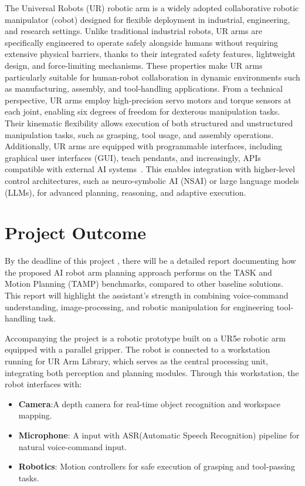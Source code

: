 \documentclass[12pt]{extarticle}
\begin{document}
The Universal Robots (UR) robotic arm is a widely adopted collaborative robotic manipulator (cobot) designed for flexible deployment in industrial, engineering, and research settings. Unlike traditional industrial robots, UR arms are specifically engineered to operate safely alongside humans without requiring extensive physical barriers, thanks to their integrated safety features, lightweight design, and force-limiting mechanisms. These properties make UR arms particularly suitable for human-robot collaboration in dynamic environments such as manufacturing, assembly, and tool-handling applications.
From a technical perspective, UR arms employ high-precision servo motors and torque sensors at each joint, enabling six degrees of freedom for dexterous manipulation tasks. Their kinematic flexibility allows execution of both structured and unstructured manipulation tasks, such as grasping, tool usage, and assembly operations. Additionally, UR arms are equipped with programmable interfaces, including graphical user interfaces (GUI), teach pendants, and increasingly, APIs compatible with external AI systems~\cite{urarm}. This enables integration with higher-level control architectures, such as neuro-symbolic AI (NSAI) or large language models (LLMs), for advanced planning, reasoning, and adaptive execution.


\newpage
\section{Project Outcome}

By the deadline of this project , there will be a detailed report documenting how the proposed AI robot arm planning approach performs on the TASK and Motion Planning (TAMP) benchmarks, compared to other baseline solutions. This report will highlight the assistant's strength in combining voice-command understanding, image-processing, and robotic manipulation for engineering tool-handling task.

Accompanying the project is a robotic prototype built on a UR5e robotic arm equipped with a parallel gripper. The robot is connected to a workstation running for UR Arm Library, which serves as the central processing unit, integrating both perception and planning modules. Through this workstation, the robot interfaces with:

\begin{itemize}
    \item \textbf{Camera}:A depth camera for real-time object recognition and workspace mapping.
    \item \textbf{Microphone}: A input with ASR(Automatic Speech Recognition) pipeline for natural voice-command input.
    \item \textbf{Robotics}: Motion controllers for safe execution of grasping and tool-passing tasks. 
\end{itemize}
\end{document}
